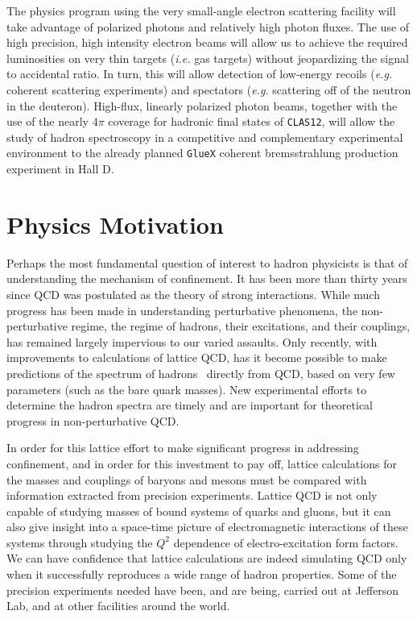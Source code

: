 The physics program using the very small-angle electron scattering
facility will take advantage of polarized photons and relatively high
photon fluxes. The use of high precision, high intensity electron beams 
will allow us to achieve the required luminosities on very thin targets 
({\it i.e.} gas targets) without jeopardizing the signal to accidental 
ratio. In turn, this will allow detection of low-energy recoils ({\it e.g.} 
coherent scattering experiments) and spectators ({\it e.g.} scattering 
off of the neutron in the deuteron). High-flux, linearly polarized
photon beams, together with the use of the nearly $4\pi$ coverage for 
hadronic final states of {\tt CLAS12}, will allow the study of hadron 
spectroscopy in a competitive and complementary experimental environment 
to the already planned {\tt GlueX} coherent bremsstrahlung production 
experiment in Hall D.

\section{Physics Motivation}

Perhaps the most fundamental question of interest to hadron physicists
is that of understanding the mechanism of confinement. It has been more
than thirty years since QCD was postulated as the theory of strong
interactions.  While much progress has been made in understanding
perturbative phenomena, the non-perturbative regime, the regime of
hadrons, their excitations, and their couplings, has remained largely
impervious to our varied assaults.  Only recently, with improvements 
to calculations of lattice QCD, has it become possible to make 
predictions of the spectrum of hadrons~\cite{morningstar,mathur}
directly from QCD, based on very few parameters (such as the bare quark 
masses). New experimental efforts to determine the hadron spectra are 
timely and are important for theoretical progress in non-perturbative QCD.

In order for this lattice effort to make significant progress in addressing 
confinement, and in order for this investment to pay off, lattice 
calculations for the masses and couplings of baryons and mesons must be 
compared with information extracted from precision experiments. Lattice 
QCD is not only capable of studying masses of bound systems of quarks 
and gluons, but it can also give insight into a space-time picture of 
electromagnetic interactions of these systems through studying the $Q^2$ 
dependence of electro-excitation form factors. We can have confidence that 
lattice calculations are indeed simulating QCD only when it successfully
reproduces a wide range of hadron properties. Some of the precision
experiments needed have been, and are being, carried out at Jefferson
Lab, and at other facilities around the world.

